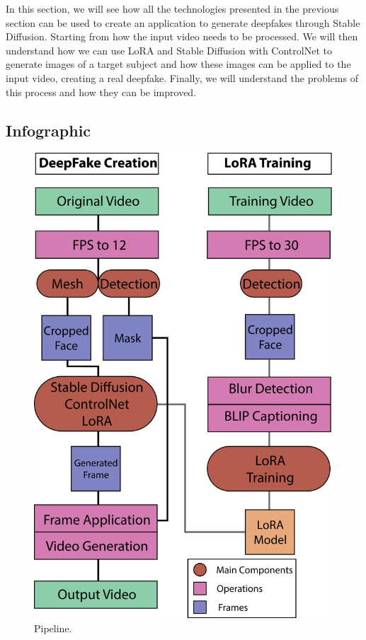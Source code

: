 \documentclass[preprint]{elsarticle}
\begin{document}
In this section, we will see how all the technologies presented in the previous  section can be used to create an application to generate deepfakes through Stable Diffusion.  Starting from how the input video needs to be processed.  We will then understand how we can use LoRA and Stable Diffusion with ControlNet to  generate images of a target subject and how these images can be applied to the input video, 
creating a real deepfake.  Finally, we will understand the problems of this process and how they can be improved.



\subsection{Infographic} \label{sec:project_info}

\begin{figure}[t]
	\centering
	\includegraphics[scale=0.65]{img/svg/Info.png}
	\caption{Pipeline.}\label{fig:project}
\end{figure}
\end{document}
